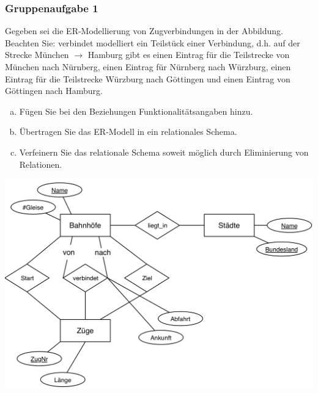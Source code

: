\begin{frame}
	\frametitle{Gruppenaufgabe 1}
	\vspace{0.5cm}

	\begin{multicols}{2}
		Gegeben sei die ER-Modellierung von Zugverbindungen in der Abbildung.
		Beachten Sie: verbindet modelliert ein Teilstück einer Verbindung,
		d.h. auf der Strecke München \( \rightarrow \) Hamburg gibt es einen Eintrag für
		die Teilstrecke von München nach Nürnberg,
		einen Eintrag für Nürnberg nach Würzburg,
		einen Eintrag für die Teilstrecke Würzburg nach Göttingen und einen Eintrag von Göttingen nach Hamburg.
		\begin{enumerate}[a)]
			\item<1-> Fügen Sie bei den Beziehungen Funktionalitätsangaben hinzu.
			\item<2-> Übertragen Sie das ER-Modell in ein relationales Schema.
			\item<3-> Verfeinern Sie das relationale Schema soweit möglich durch Eliminierung von Relationen.
		\end{enumerate}

		\vfill\columnbreak
		\begin{center}
			\includegraphics[height=.5\paperheight]{./er_modell1.png}
		\end{center}
	\end{multicols}
\end{frame}



